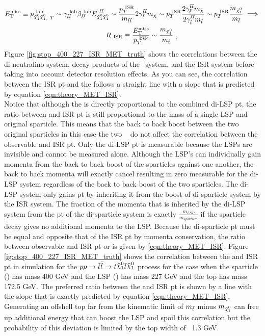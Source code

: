 \begin{align}
\MET \equiv p_{\ninoone\ninoone,~T}^{~\mathrm{lab}} \sim \gamma_{\stop\stop}^{~\mathrm{lab}} \beta_{\stop\stop}^{~\mathrm{lab}} E_{\ninoone\ninoone}^{~\stop\stop} 
\sim \frac{\PTISR}{m_{\stop\stop}} 2\gamma_{\stop}^{\stop\stop} m_{\tilde{\chi}} \sim
\PTISR \frac{ 2\gamma_{\stop}^{\stop\stop} m_{\tilde{\chi}} }{ 2\gamma_{\stop}^{\stop\stop} m_{\stop} } \sim
\PTISR \frac{m_{\ninoone}}{m_{\stop}}\implies\\
\RISR \equiv \frac{\MET}{\PTISR} \sim \frac{m_{\ninoone}}{m_{\stop}}~,\quad\quad\quad\quad\quad\quad\quad\quad\quad\quad\quad\quad
\label{eqn:theory_MET_ISR}
\end{align}
\indent Figure \ref{fig:stop_400_227_ISR_MET_truth} shows the correlations between the di-neutralino system, decay products of the \antibar{\stop}~system, and the ISR system before taking into account detector resolution effects. As you can see, the correlation between the ISR pt and the \MET follows a straight line with a slope that is predicted by equation \ref{eqn:theory_MET_ISR}. \\

\indent Notice that although the \MET is directly proportional to the combined di-LSP pt, the ratio between \MET and ISR pt is still proportional to the mass of a single LSP and original sparticle.  This means that the back to back boost between the two original sparticles in this case the two \stop~ do not affect the correlation between the observable \MET and ISR pt.  Only the di-LSP pt is measurable because the LSPs are invisible and cannot be measured alone.  Although the LSP's can individually gain momenta from the back to back boost of the sparticles against one another, the back to back momenta will exactly cancel resulting in zero measurable \MET for the di-LSP system regardless of the back to back boost of the two sparticles.  The di-LSP system only gains pt by inheriting it from the boost of di-sparticle system by the ISR system.  The fraction of the momenta that is inherited by the di-LSP system 
from the pt of the di-sparticle system is exactly $\frac{m_{LSP}}{m_{sparticle}}$ if the sparticle decay gives no additional momenta to the LSP.  Because the di-sparticle pt must be equal and opposite that of the ISR pt by momenta conservation, the ratio between observable \MET and ISR pt or \RISR is given by \ref{eqn:theory_MET_ISR}.  Figure \ref{ig:stop_400_227_ISR_MET_truth} shows the correlation between the \MET and ISR pt in simulation for the $p p \rightarrow \antibar{\stop} \rightarrow t\ninoone\tbar\ninoone$ process for the case when the sparticle (\stop) has mass 400 GeV and the LSP (\ninoone) has mass 227 GeV and the top has mass 172.5 GeV. The preferred ratio between the \met and ISR pt is shown by a line with the slope that is exactly predicted by equation \ref{eqn:theory_MET_ISR}.  Generating an offshell top far from the kinematic limit of $m_{\tilde{t}}$ minus $m_{\ninoone}$ can free up additional energy that can boost the LSP and spoil this correlation but the probability of this deviation is limited by the top width of ~1.3 GeV.  ~\\

